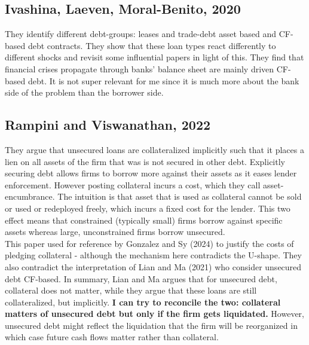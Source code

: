 \documentclass[12pt]{article}
\begin{document}
\subsection*{Ivashina, Laeven, Moral-Benito, 2020  \checkmark}
They identify different debt-groups: leases and trade-debt asset based and CF-based debt contracts. They show that these loan types react differently to different shocks and revisit some influential papers in light of this. They find that financial crises propagate through banks' balance sheet are mainly driven CF-based debt. It is not super relevant for me since it is much more about the bank side of the problem than the borrower side. 

\subsection*{Rampini and Viswanathan, 2022 \checkmark}
They argue that unsecured loans are collateralized implicitly such that it places a lien on all assets of the firm that was is not secured in other debt. Explicitly securing debt allows firms to borrow more against their assets as it eases lender enforcement. However posting collateral incurs a cost, which they call asset-encumbrance. The intuition is that asset that is used as collateral cannot be sold or used or redeployed freely, which incurs a fixed cost for the lender. This two effect means that constrained (typically small) firms borrow against specific assets whereas large, unconstrained firms borrow unsecured. \vspace*{3mm} \\ 
This paper used for reference by Gonzalez and Sy (2024) to justify the costs of pledging collateral - although the mechanism here contradicts the U-shape. They also contradict the interpretation of Lian and Ma (2021) who consider unsecured debt CF-based. In summary, Lian and Ma argues that for unsecured debt, collateral does not matter, while they argue that these loans are still collateralized, but implicitly. \textbf{I can try to reconcile the two: collateral matters of unsecured debt but only if the firm gets liquidated.} However, unsecured debt might reflect the liquidation that the firm will be reorganized in which case future cash flows matter rather than collateral. 
\end{document}
